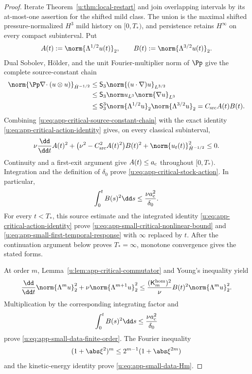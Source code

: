 \begin{proof}
Iterate Theorem~\ref{u:thm:local-restart} and join overlapping intervals by
its at-most-one assertion for the shifted mild class.  The union is the
maximal shifted pressure-normalized \(H^3\) mild history on \([0,T_*)\), and
persistence retains \(H^\infty\) on
every compact subinterval.  Put
\[
 A(t):=\norm{\Lambda^{1/2}u(t)}_2,
 \qquad
 B(t):=\norm{\Lambda^{3/2}u(t)}_2.
\]
 Dual Sobolev, H\"older, and the unit Fourier-multiplier norm of \(\Pp\)
give the complete source-constant chain
\begin{align}
 \norm{\Pp\nabla\!\cdot(u\otimes u)}_{\dot H^{-1/2}}
 &\le \mathsf S_3\norm{(u\cdot\nabla)u}_{L^{3/2}}
 \notag\\
 &\le \mathsf S_3\norm u_{L^3}\norm{\nabla u}_{L^3}
 \notag\\
 &\le \mathsf S_3^3
      \norm{\Lambda^{1/2}u}_2
      \norm{\Lambda^{3/2}u}_2
 =C_{\rm src}A(t)B(t).
 \label{u:eq:app-critical-source-constant-chain}
\end{align}
Combining \eqref{u:eq:app-critical-source-constant-chain} with the exact
identity \eqref{u:eq:app-critical-action-identity} gives, on every classical
subinterval,
\[
 \nu\frac{\dd}{\dd t}A(t)^2
 +\bigl(\nu^2-C_{\rm src}^2A(t)^2\bigr)B(t)^2
 +\norm{u_t(t)}_{\dot H^{-1/2}}^2\le0.
\]
Continuity and a first-exit argument give \(A(t)\le a_{\rm c}\) throughout
\([0,T_*)\).  Integration and the definition of \(\delta_0\) prove
\eqref{u:eq:app-critical-stock-action}.  In particular,
\[
 \int_0^tB(s)^2\dd s\le\frac{\nu a_{\rm c}^2}{\delta_0}.
\]
For every \(t<T_*\), this source estimate and the integrated identity
\eqref{u:eq:app-critical-action-identity} prove
\eqref{u:eq:app-small-critical-nonlinear-bound} and
\eqref{u:eq:app-small-first-temporal-response} with \(\infty\) replaced by
\(t\).  After the continuation argument below proves \(T_*=\infty\),
monotone convergence gives the stated forms.

At order \(m\), Lemma~\ref{u:lem:app-critical-commutator} and Young's
inequality yield
\[
 \frac{\dd}{\dd t}\norm{\Lambda^mu}_2^2
 +\nu\norm{\Lambda^{m+1}u}_2^2
 \le
 \frac{(\mathsf K_m^{\rm hom})^2}{\nu}
 B(t)^2\norm{\Lambda^mu}_2^2.
\]
Multiplication by the corresponding integrating factor and
\[
 \int_0^tB(s)^2\dd s\le\frac{\nu a_{\rm c}^2}{\delta_0}
\]
prove \eqref{u:eq:app-small-data-finite-order}.  The Fourier inequality
\[
 (1+\abs\xi^2)^m\le2^{m-1}(1+\abs\xi^{2m})
\]
and the kinetic-energy identity prove \eqref{u:eq:app-small-data-Hm}.


\end{proof}
